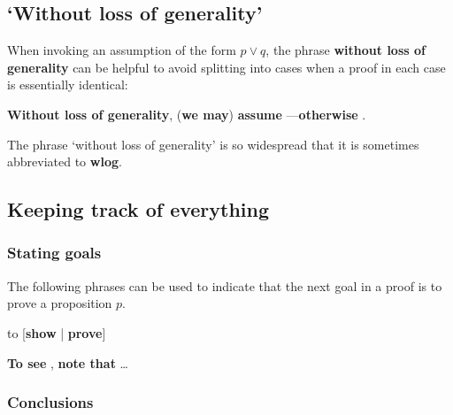 \todo{}

\subsection*{`Without loss of generality'}

\todo{}

\begin{vocabulary}
When invoking an assumption of the form $p \vee q$, the phrase \textbf{without loss of generality} can be helpful to avoid splitting into cases when a proof in each case is essentially identical:

\begin{vocabtemplate}
\textbf{Without loss of generality}, (\textbf{we may}) \textbf{assume} ---\textbf{otherwise} .
\end{vocabtemplate}

The phrase `without loss of generality' is so widespread that it is sometimes abbreviated to \textbf{wlog}.
\end{vocabulary}

\todo{}

\subsection*{Keeping track of everything}

\subsubsection*{Stating goals}

\todo{}

\begin{vocabulary}
The following phrases can be used to indicate that the next goal in a proof is to prove a proposition $p$.

\begin{vocabtemplate}
 {to} [\textbf{show} | \textbf{prove}] 

\vtor

\textbf{To see} , \textbf{note that} \dots{}
\end{vocabtemplate}
\end{vocabulary}

\todo{}

\subsubsection*{Conclusions}

